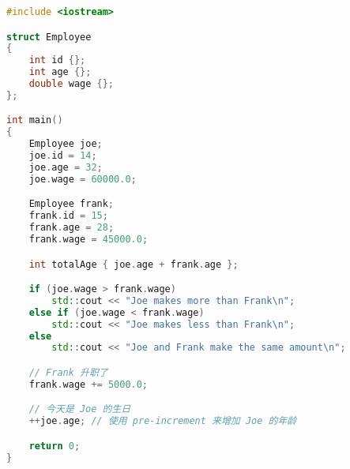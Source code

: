 \documentclass[../../LearnCpp.tex]{subfiles}
\begin{document}
\begin{lstlisting}[language=C++]
#include <iostream>

struct Employee
{
    int id {};
    int age {};
    double wage {};
};

int main()
{
    Employee joe;
    joe.id = 14;
    joe.age = 32;
    joe.wage = 60000.0;

    Employee frank;
    frank.id = 15;
    frank.age = 28;
    frank.wage = 45000.0;

    int totalAge { joe.age + frank.age };

    if (joe.wage > frank.wage)
        std::cout << "Joe makes more than Frank\n";
    else if (joe.wage < frank.wage)
        std::cout << "Joe makes less than Frank\n";
    else
        std::cout << "Joe and Frank make the same amount\n";

    // Frank 升职了
    frank.wage += 5000.0;

    // 今天是 Joe 的生日
    ++joe.age; // 使用 pre-increment 来增加 Joe 的年龄

    return 0;
}
\end{lstlisting}
\end{document}
